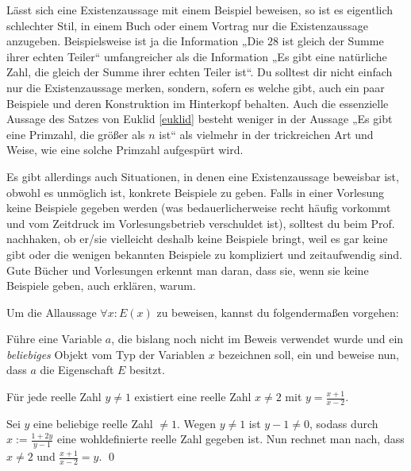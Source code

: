   
\begin{bem}
    Lässt sich eine Existenzaussage mit einem Beispiel beweisen, so ist es eigentlich schlechter Stil, in einem Buch oder einem Vortrag nur die Existenzaussage anzugeben. Beispielsweise ist ja die Information „Die $28$ ist gleich der Summe ihrer echten Teiler“ umfangreicher als die Information „Es gibt eine natürliche Zahl, die gleich der Summe ihrer echten Teiler ist“. Du solltest dir nicht einfach nur die Existenzaussage merken, sondern, sofern es welche gibt, auch ein paar Beispiele und deren Konstruktion im Hinterkopf behalten. Auch die essenzielle Aussage des Satzes von Euklid \cref{euklid} besteht weniger in der Aussage „Es gibt eine Primzahl, die größer als $n$ ist“ als vielmehr in der trickreichen Art und Weise, wie eine solche Primzahl aufgespürt wird.
    
    Es gibt allerdings auch Situationen, in denen eine Existenzaussage beweisbar ist, obwohl es unmöglich ist, konkrete Beispiele zu geben. Falls in einer Vorlesung keine Beispiele gegeben werden (was bedauerlicherweise recht häufig vorkommt und vom Zeitdruck im Vorlesungsbetrieb verschuldet ist), solltest du beim Prof. nachhaken, ob er/sie vielleicht deshalb keine Beispiele bringt, weil es gar keine gibt oder die wenigen bekannten Beispiele zu kompliziert und zeitaufwendig sind. Gute Bücher und Vorlesungen erkennt man daran, dass sie, wenn sie keine Beispiele geben, auch erklären, warum.
\end{bem}


\begin{axiom}\label{allbeweis} 
    Um die Allaussage $\forall x: E(x)$ zu beweisen, kannst du folgendermaßen vorgehen:
    
    Führe eine Variable $a$, die bislang noch nicht im Beweis verwendet wurde und ein \emph{beliebiges} Objekt vom Typ der Variablen $x$ bezeichnen soll, ein und beweise nun, dass $a$ die Eigenschaft $E$ besitzt.
\end{axiom}


\begin{bsp} \label{bsp:allbeweis}
    Für jede reelle Zahl $y\neq 1$ existiert eine reelle Zahl $x\neq 2$ mit $y=\frac{x+1}{x-2}$.
\end{bsp}


\begin{bew}
    Sei $y$ eine beliebige reelle Zahl $\neq 1$. Wegen $y\neq 1$ ist $y-1\neq 0$, sodass durch $x:= \frac{1+2y}{y-1}$ eine wohldefinierte reelle Zahl gegeben ist. Nun rechnet man nach, dass $x\neq 2$ und $\frac{x+1}{x-2}=y$. \qed
\end{bew}

